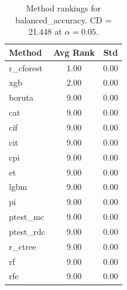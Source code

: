 \begin{table}[h]
\centering
\caption{Method rankings for balanced_accuracy. CD = 21.448 at $\alpha=0.05$.}
\label{tab:ranks_balanced_accuracy}
\begin{tabular}{lcc}
\toprule
Method & Avg Rank & Std \\
\midrule
r_cforest & 1.00 & 0.00 \\
xgb & 2.00 & 0.00 \\
boruta & 9.00 & 0.00 \\
cat & 9.00 & 0.00 \\
cif & 9.00 & 0.00 \\
cit & 9.00 & 0.00 \\
cpi & 9.00 & 0.00 \\
et & 9.00 & 0.00 \\
lgbm & 9.00 & 0.00 \\
pi & 9.00 & 0.00 \\
ptest_mc & 9.00 & 0.00 \\
ptest_rdc & 9.00 & 0.00 \\
r_ctree & 9.00 & 0.00 \\
rf & 9.00 & 0.00 \\
rfe & 9.00 & 0.00 \\
\bottomrule
\end{tabular}
\end{table}